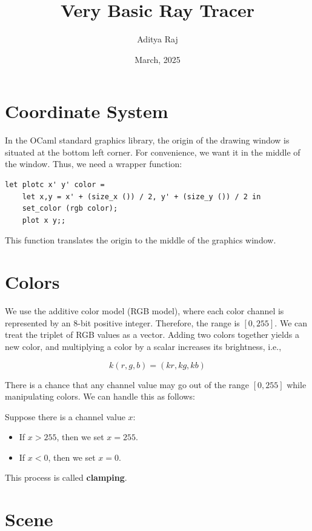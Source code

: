 \documentclass{article}
\title{Very Basic Ray Tracer}
\author{Aditya Raj}
\date{March, 2025}
\begin{document}
\maketitle

\tableofcontents

\section{Coordinate System}

In the OCaml standard graphics library, the origin of the drawing window is situated at the bottom left corner. For convenience, we want it in the middle of the window. Thus, we need a wrapper function:

\begin{verbatim}
let plotc x' y' color =
    let x,y = x' + (size_x ()) / 2, y' + (size_y ()) / 2 in 
    set_color (rgb color);
    plot x y;;
\end{verbatim}

This function translates the origin to the middle of the graphics window.

\section{Colors}

We use the additive color model (RGB model), where each color channel is represented by an 8-bit positive integer. Therefore, the range is $[0,255]$. We can treat the triplet of RGB values as a vector. Adding two colors together yields a new color, and multiplying a color by a scalar increases its brightness, i.e.,

$$k (r, g, b) = (kr, kg, kb)$$

There is a chance that any channel value may go out of the range $[0,255]$ while manipulating colors. We can handle this as follows:

Suppose there is a channel value $x$:
\begin{itemize}
    \item If $x > 255$, then we set $x = 255$.
    \item If $x < 0$, then we set $x = 0$.
\end{itemize}

This process is called \textbf{clamping}.

\section{Scene}
\end{document}
